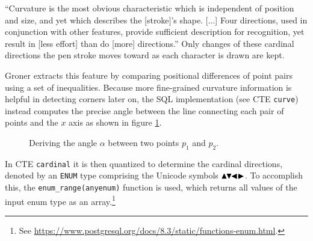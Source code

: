 \documentclass[sigconf]{acmart}
\begin{document}
\enquote{Curvature is the most obvious characteristic which is independent of position and size, and yet which describes the [stroke]'s shape. [...] Four directions, used in conjunction with other features, provide sufficient description for recognition, yet result in [less effort] than do [more] directions.} \cite{groner} Only changes of these cardinal directions the pen stroke moves toward as each character is drawn are kept.

Groner extracts this feature by comparing positional differences of point pairs using a set of inequalities. Because more fine-grained curvature information is helpful in detecting corners later on, the SQL implementation (see CTE \texttt{curve}) instead computes the precise angle between the line connecting each pair of points and the $x$ axis as shown in figure \ref{tan}.

\begin{figure}[htpb]
  \centering
  \caption{Deriving the angle $\alpha$ between two points $p_1$ and $p_2$.}
  \label{tan}
\end{figure}

In CTE \texttt{cardinal} it is then quantized to determine the cardinal directions, denoted by an \texttt{ENUM} type comprising the Unicode symbols $\blacktriangle\hspace{-0.15em}\blacktriangledown\hspace{-0.41em}\blacktriangleleft\blacktriangleright$. To accomplish this, the \texttt{enum\_range(anyenum)} function is used, which returns all values of the input enum type as an array.\footnote{See \url{https://www.postgresql.org/docs/8.3/static/functions-enum.html}.}
\end{document}
